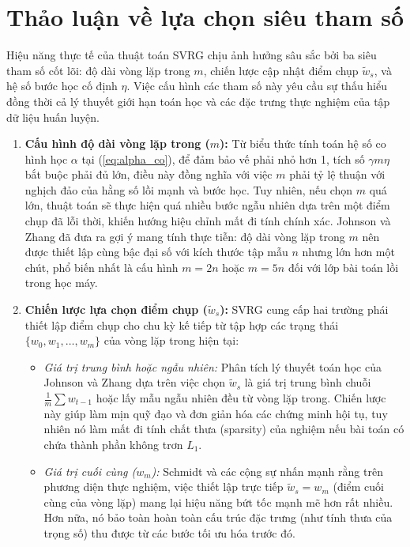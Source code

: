 \section{Thảo luận về lựa chọn siêu tham số}

Hiệu năng thực tế của thuật toán SVRG chịu ảnh hưởng sâu sắc bởi ba siêu tham số cốt lõi: độ dài vòng lặp trong $m$, chiến lược cập nhật điểm chụp $\tilde{w}_s$, và hệ số bước học cố định $\eta$. Việc cấu hình các tham số này yêu cầu sự thấu hiểu đồng thời cả lý thuyết giới hạn toán học và các đặc trưng thực nghiệm của tập dữ liệu huấn luyện.



\begin{enumerate}
    \item \textbf{Cấu hình độ dài vòng lặp trong ($m$):} Từ biểu thức tính toán hệ số co hình học $\alpha$ tại (\ref{eq:alpha_co}), để đảm bảo vế phải nhỏ hơn 1, tích số $\gamma m \eta$ bắt buộc phải đủ lớn, điều này đồng nghĩa với việc $m$ phải tỷ lệ thuận với nghịch đảo của hằng số lồi mạnh và bước học. Tuy nhiên, nếu chọn $m$ quá lớn, thuật toán sẽ thực hiện quá nhiều bước ngẫu nhiên dựa trên một điểm chụp đã lỗi thời, khiến hướng hiệu chỉnh mất đi tính chính xác. Johnson và Zhang \cite{johnson2013accelerating} đã đưa ra gợi ý mang tính thực tiễn: độ dài vòng lặp trong $m$ nên được thiết lập cùng bậc đại số với kích thước tập mẫu $n$ nhưng lớn hơn một chút, phổ biến nhất là cấu hình $m = 2n$ hoặc $m = 5n$ đối với lớp bài toán lồi trong học máy.

    \item \textbf{Chiến lược lựa chọn điểm chụp ($\tilde{w}_s$):} SVRG cung cấp hai trường phái thiết lập điểm chụp cho chu kỳ kế tiếp từ tập hợp các trạng thái $\{w_0, w_1, \dots, w_m\}$ của vòng lặp trong hiện tại:

    \begin{itemize}

        \item \textit{Giá trị trung bình hoặc ngẫu nhiên:} Phân tích lý thuyết toán học của Johnson và Zhang \cite{johnson2013accelerating} dựa trên việc chọn $\tilde{w}_s$ là giá trị trung bình chuỗi $\frac{1}{m}\sum w_{t-1}$ hoặc lấy mẫu ngẫu nhiên đều từ vòng lặp trong. Chiến lược này giúp làm mịn quỹ đạo và đơn giản hóa các chứng minh hội tụ, tuy nhiên nó làm mất đi tính chất thưa (sparsity) của nghiệm nếu bài toán có chứa thành phần không trơn $L_1$.

        \item \textit{Giá trị cuối cùng ($w_m$):} Schmidt và các cộng sự \cite{schmidt2017minimizing} nhấn mạnh rằng trên phương diện thực nghiệm, việc thiết lập trực tiếp $\tilde{w}_s = w_m$ (điểm cuối cùng của vòng lặp) mang lại hiệu năng bứt tốc mạnh mẽ hơn rất nhiều. Hơn nữa, nó bảo toàn hoàn toàn cấu trúc đặc trưng (như tính thưa của trọng số) thu được từ các bước tối ưu hóa trước đó.


\end{itemize}
\end{enumerate}
